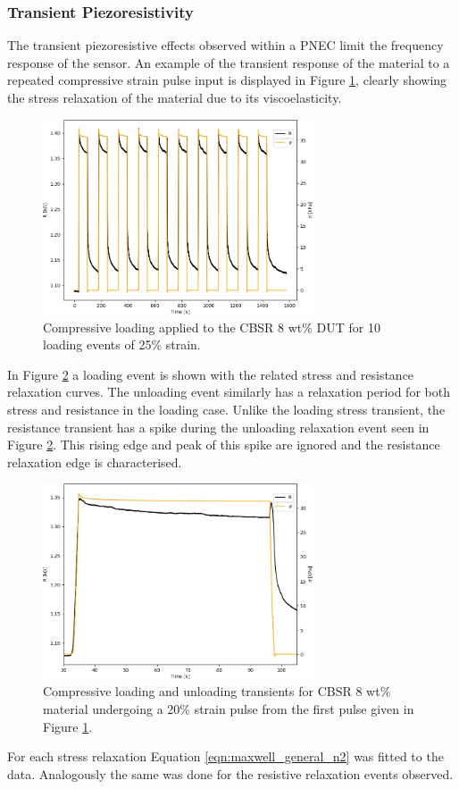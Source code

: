 \subsubsection{Transient Piezoresistivity}\label{sec:Transient Piezoresistivity2}
The transient piezoresistive effects observed within a PNEC limit the frequency response of the sensor. An example of the transient response of the material to a repeated compressive strain pulse input is displayed in Figure \ref{fig:stress_seq}, clearly showing the stress relaxation of the material due to its viscoelasticity. 
\begin{figure}[h!]
    \centering
    \includegraphics[width=8cm]{Figures/CBSR 8 wt 25p strain - 1D test stress seq.jpg}
    \caption{Compressive loading applied to the CBSR 8 wt\% DUT for 10 loading events of 25\% strain.}
    \label{fig:stress_seq}
\end{figure}
In Figure \ref{fig:load_relax_eg} a loading event is shown with the related stress and resistance relaxation curves. The unloading event similarly has a relaxation period for both stress and resistance in the loading case. Unlike the loading stress transient, the resistance transient has a spike during the unloading relaxation event seen in Figure \ref{fig:load_relax_eg}. This rising edge and peak of this spike are ignored and the resistance relaxation edge is characterised.  
\begin{figure}[h!]
    \centering
    \includegraphics[width=8cm]{Figures/CBSR 8 wt 25p strain - 1D stress load unload.jpg}
    \caption{Compressive loading and unloading transients for CBSR 8 wt\% material undergoing a 20\% strain pulse from the first pulse given in Figure \ref{fig:stress_seq}.}
    \label{fig:load_relax_eg}
\end{figure}
For each stress relaxation Equation \ref{eqn:maxwell_general_n2} was fitted to the data. Analogously the same was done for the resistive relaxation events observed. 

